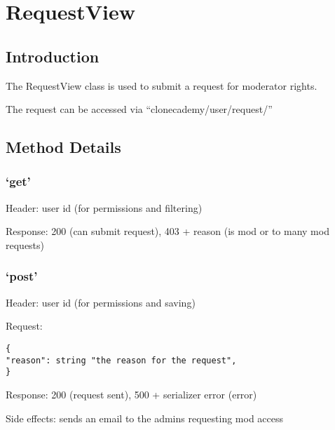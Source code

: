 \chapter*{RequestView}

\section*{Introduction}\label{introduction}

The RequestView class is used to submit a request for moderator rights.

The request can be accessed via ``clonecademy/user/request/''

\section*{Method Details}\label{method-details}

\subsection*{\texorpdfstring{`get'}{get}}\label{get}

Header: user id (for permissions and filtering)

Response: 200 (can submit request), 403 + reason (is mod or to many mod
requests)

\subsection*{\texorpdfstring{`post'}{post}}\label{post}

Header: user id (for permissions and saving)

Request:

\begin{verbatim}
{
"reason": string "the reason for the request",
}
\end{verbatim}

Response: 200 (request sent), 500 + serializer error (error)

Side effects: sends an email to the admins requesting mod access

